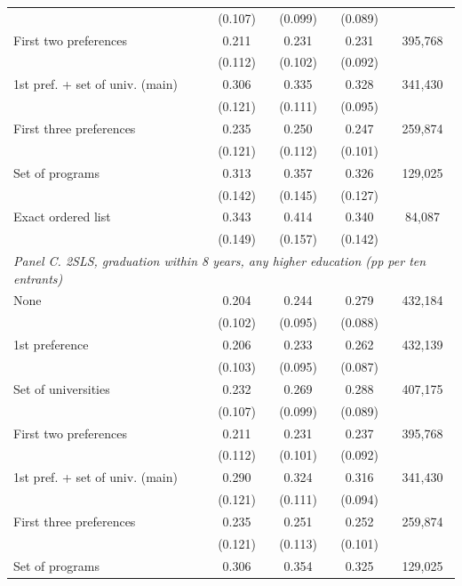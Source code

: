\begin{tabular}{l*{4}{c}}
 & (0.107) & (0.099) & (0.089) & \\
First two preferences &  0.211\sym{*} &  0.231\sym{**} &  0.231\sym{**} &   395,768 \\
 & (0.112) & (0.102) & (0.092) & \\
1st pref. + set of univ. (main) &  0.306\sym{**} &  0.335\sym{***} &  0.328\sym{***} &   341,430 \\
 & (0.121) & (0.111) & (0.095) & \\
First three preferences &  0.235\sym{*} &  0.250\sym{**} &  0.247\sym{**} &   259,874 \\
 & (0.121) & (0.112) & (0.101) & \\
Set of programs &  0.313\sym{**} &  0.357\sym{**} &  0.326\sym{**} &   129,025 \\
 & (0.142) & (0.145) & (0.127) & \\
Exact ordered list &  0.343\sym{**} &  0.414\sym{***} &  0.340\sym{**} &    84,087 \\
 & (0.149) & (0.157) & (0.142) & \\
\midrule
\multicolumn{5}{l}{\textit{Panel C. 2SLS, graduation within 8 years, any higher education (pp per ten entrants)}} \\
None &  0.204\sym{**} &  0.244\sym{**} &  0.279\sym{***} &   432,184 \\
 & (0.102) & (0.095) & (0.088) & \\
1st preference &  0.206\sym{**} &  0.233\sym{**} &  0.262\sym{***} &   432,139 \\
 & (0.103) & (0.095) & (0.087) & \\
Set of universities &  0.232\sym{**} &  0.269\sym{***} &  0.288\sym{***} &   407,175 \\
 & (0.107) & (0.099) & (0.089) & \\
First two preferences &  0.211\sym{*} &  0.231\sym{**} &  0.237\sym{***} &   395,768 \\
 & (0.112) & (0.101) & (0.092) & \\
1st pref. + set of univ. (main) &  0.290\sym{**} &  0.324\sym{***} &  0.316\sym{***} &   341,430 \\
 & (0.121) & (0.111) & (0.094) & \\
First three preferences &  0.235\sym{*} &  0.251\sym{**} &  0.252\sym{**} &   259,874 \\
 & (0.121) & (0.113) & (0.101) & \\
Set of programs &  0.306\sym{**} &  0.354\sym{**} &  0.325\sym{***} &   129,025 \\

\end{tabular}
